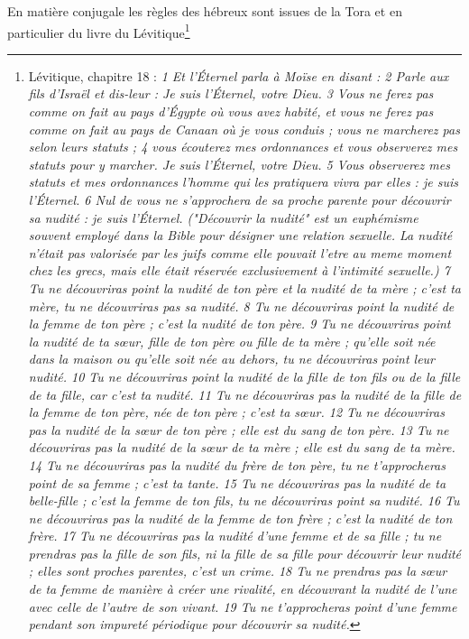  En matière conjugale les règles des hébreux sont issues de la Tora et en particulier du livre du Lévitique\footnote{Lévitique, chapitre 18 : \emph{1 Et l'Éternel parla à Moïse en disant :
2 Parle aux fils d'Israël et dis-leur : Je suis l'Éternel, votre Dieu.
3 Vous ne ferez pas comme on fait au pays d'Égypte où vous avez habité, et vous ne ferez pas comme on fait au pays de Canaan où je vous conduis ; vous ne marcherez pas selon leurs statuts ;
4 vous écouterez mes ordonnances et vous observerez mes statuts pour y marcher. Je suis l'Éternel, votre Dieu.
5 Vous observerez mes statuts et mes ordonnances l'homme qui les pratiquera vivra par elles : je suis l'Éternel.
6 Nul de vous ne s'approchera de sa proche parente pour découvrir sa nudité : je suis l'Éternel.\emph{ ("Découvrir la nudité" est un euphémisme  souvent employé dans la Bible pour désigner une relation sexuelle. La nudité n'était pas valorisée par les juifs comme elle pouvait l'etre au meme moment chez les grecs, mais elle était réservée exclusivement à l'intimité sexuelle.)}
7 Tu ne découvriras point la nudité de ton père et la nudité de ta mère ; c'est ta mère, tu ne découvriras pas sa nudité.
8 Tu ne découvriras point la nudité de la femme de ton père ; c'est la nudité de ton père.
9 Tu ne découvriras point la nudité de ta sœur, fille de ton père ou fille de ta mère ; qu'elle soit née dans la maison ou qu'elle soit née au dehors, tu ne découvriras point leur nudité.
10 Tu ne découvriras point la nudité de la fille de ton fils ou de la fille de ta fille, car c'est ta nudité.
11 Tu ne découvriras pas la nudité de la fille de la femme de ton père, née de ton père ; c'est ta sœur.
12 Tu ne découvriras pas la nudité de la sœur de ton père ; elle est du sang de ton père.
13 Tu ne découvriras pas la nudité de la sœur de ta mère ; elle est du sang de ta mère.
14 Tu ne découvriras pas la nudité du frère de ton père, tu ne t'approcheras point de sa femme ; c'est ta tante.
15 Tu ne découvriras pas la nudité de ta belle-fille ; c'est la femme de ton fils, tu ne découvriras point sa nudité.
16 Tu ne découvriras pas la nudité de la femme de ton frère ; c'est la nudité de ton frère.
17 Tu ne découvriras pas la nudité d'une femme et de sa fille ; tu ne prendras pas la fille de son fils, ni la fille de sa fille pour découvrir leur nudité ; elles sont proches parentes, c'est un crime.
18 Tu ne prendras pas la sœur de ta femme de manière à créer une rivalité, en découvrant la nudité de l'une avec celle de l'autre de son vivant.
19 Tu ne t'approcheras point d'une femme pendant son impureté périodique pour découvrir sa nudité.
}}
